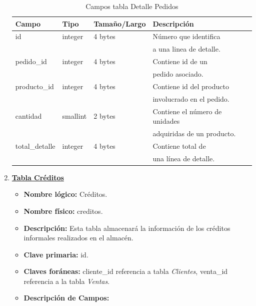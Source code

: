 \documentclass[letterpaper,12pt]{article}
\begin{document}
\begin{enumerate}
\begin{table}[!ht]
\caption{Campos tabla Detalle Pedidos}
\begin{center}
\begin{tabular}{|l|l|l|l|}
\hline
\textbf{Campo} \hspace*{2cm} & \textbf{Tipo} & \textbf{Tamaño/Largo} & \textbf{Descripción} \hspace*{3,5cm} \\
\hline
id & integer & 4 bytes&Número que identifica \\ 
\mbox{} & \mbox{} & &a una linea de detalle.\\
\hline

pedido\_id & integer & 4 bytes&Contiene id de un\\
\mbox{} & \mbox{} & &pedido asociado.\\
\hline

producto\_id & integer & 4 bytes&Contiene id del producto\\
\mbox{} & \mbox{} & &involucrado en el pedido.\\
\hline

cantidad & smallint &2 bytes &Contiene el número de unidades\\
\mbox{} & \mbox{} & &adquiridas de un producto.\\
\hline

total\_detalle & integer & 4 bytes&Contiene total de\\
\mbox{} & \mbox{} & &una línea de detalle.\\
\hline

\end{tabular}
\end{center}
\end{table}


\newpage

\item \textbf{\underline{Tabla Créditos}}
\begin{itemize}
\item \textbf{Nombre lógico:} Créditos.
\item \textbf{Nombre físico:} creditos.
\item \textbf{Descripción:} Esta tabla almacenará la información de los créditos informales realizados en el almacén.
\item \textbf{Clave primaria:} id.
\item \textbf{Claves foráneas:} cliente\_id referencia a tabla \emph{Clientes}, venta\_id referencia a la tabla \emph{Ventas}.
\item\textbf{Descripción de Campos:}
\end{itemize}


\end{enumerate}
\end{document}
